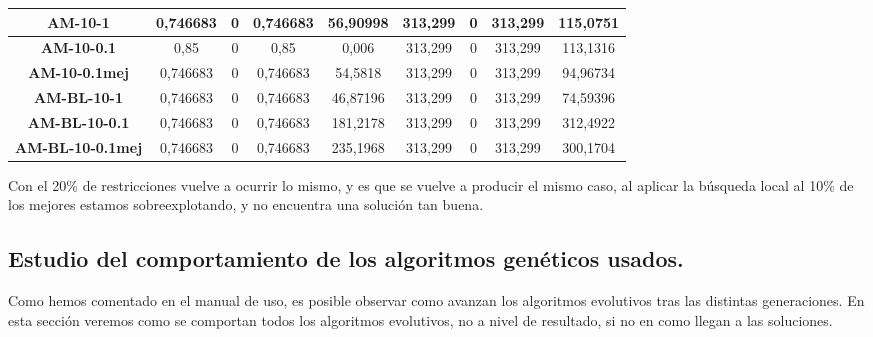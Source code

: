 \documentclass[12pt, spanish]{article}
\begin{document}
\begin{table}[H]
\begin{tabular}{|c|c|c|c|c|c|c|c|c|}
\textbf{AM-10-1}         & 0,746683                  & 0                           & 0,746683               & 56,90998   & 313,299                   & 0                           & 313,299                & 115,0751   \\ \hline
\textbf{AM-10-0.1}       & 0,85                      & 0                           & 0,85                   & 0,006      & 313,299                   & 0                           & 313,299                & 113,1316   \\ \hline
\textbf{AM-10-0.1mej}    & 0,746683                  & 0                           & 0,746683               & 54,5818    & 313,299                   & 0                           & 313,299                & 94,96734   \\ \hline
\textbf{AM-BL-10-1}      & 0,746683                  & 0                           & 0,746683               & 46,87196   & 313,299                   & 0                           & 313,299                & 74,59396   \\ \hline
\textbf{AM-BL-10-0.1}    & 0,746683                  & 0                           & 0,746683               & 181,2178   & 313,299                   & 0                           & 313,299                & 312,4922   \\ \hline
\textbf{AM-BL-10-0.1mej} & 0,746683                  & 0                           & 0,746683               & 235,1968   & 313,299                   & 0                           & 313,299                & 300,1704   \\ \hline
\end{tabular}
\end{table}

Con el 20\% de restricciones vuelve a ocurrir lo mismo, y es que se vuelve a producir el mismo caso, al aplicar la búsqueda local al 10\% de los mejores estamos sobreexplotando, y no encuentra una solución tan buena.

\newpage

\subsection{Estudio del comportamiento de los algoritmos genéticos usados.}


Como hemos comentado en el manual de uso, es posible observar como avanzan los algoritmos evolutivos tras las distintas generaciones. En esta sección veremos como se comportan todos los algoritmos evolutivos, no a nivel de resultado, si no en como llegan a las soluciones.
\end{document}
